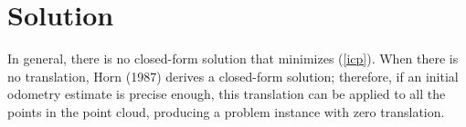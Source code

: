 \documentclass[12pt]{article}
\theoremstyle{defstyle}
\begin{document}

\section{Solution}

In general, there is no closed-form solution that minimizes (\ref{icp}).
When there is no translation, Horn (1987) derives a closed-form solution; therefore, if an initial odometry estimate is precise enough, this translation can be applied to all the points in the point cloud, producing a problem instance with zero translation.
\end{document}
